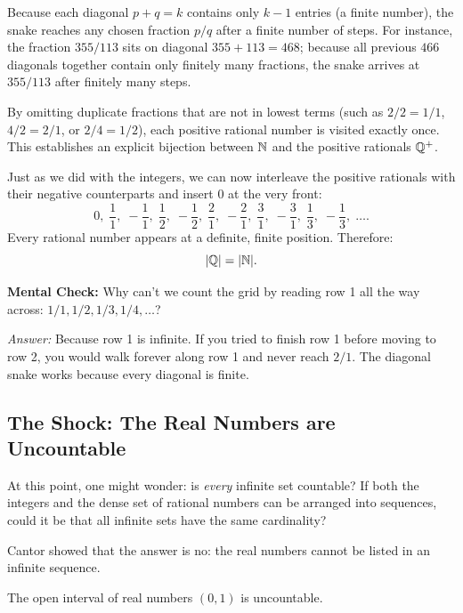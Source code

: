 Because each diagonal $p + q = k$ contains only $k - 1$ entries (a finite number), the snake reaches any chosen fraction $p/q$ after a finite number of steps. For instance, the fraction $355/113$ sits on diagonal $355 + 113 = 468$; because all previous $466$ diagonals together contain only finitely many fractions, the snake arrives at $355/113$ after finitely many steps.

By omitting duplicate fractions that are not in lowest terms (such as $2/2 = 1/1$, $4/2 = 2/1$, or $2/4 = 1/2$), each positive rational number is visited exactly once. This establishes an explicit bijection between $\mathbb{N}$ and the positive rationals $\mathbb{Q}^+$.

Just as we did with the integers, we can now interleave the positive rationals with their negative counterparts and insert $0$ at the very front:
\[
0, \; \frac{1}{1}, \; -\frac{1}{1}, \; \frac{1}{2}, \; -\frac{1}{2}, \; \frac{2}{1}, \; -\frac{2}{1}, \; \frac{3}{1}, \; -\frac{3}{1}, \; \frac{1}{3}, \; -\frac{1}{3}, \; \dots.
\]
Every rational number appears at a definite, finite position. Therefore:
\[
|\mathbb{Q}| = |\mathbb{N}|.
\]

\begin{recoverybox}
\textbf{Mental Check:} Why can't we count the grid by reading row 1 all the way across: $1/1, 1/2, 1/3, 1/4, \dots$?
\par\vspace{0.3em}
\emph{Answer:} Because row 1 is infinite. If you tried to finish row 1 before moving to row 2, you would walk forever along row 1 and never reach $2/1$. The diagonal snake works because every diagonal is finite.
\end{recoverybox}

\subsection{The Shock: The Real Numbers are Uncountable}

At this point, one might wonder: is \emph{every} infinite set countable? If both the integers and the dense set of rational numbers can be arranged into sequences, could it be that all infinite sets have the same cardinality?

Cantor showed that the answer is no: the real numbers cannot be listed in an infinite sequence.

\begin{theorem}
The open interval of real numbers $(0, 1)$ is uncountable.
\end{theorem}


